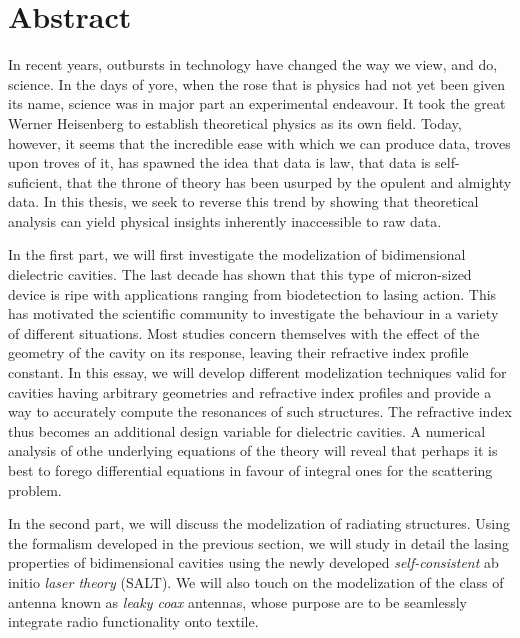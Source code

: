 \chapter*{Abstract}

In recent years, outbursts in technology have changed the way 
we view, and do, science. In the days of yore, when the rose
that is physics had not yet been given its name, science
was in major part an experimental endeavour. It took the great
Werner Heisenberg to establish theoretical physics as its own field. 
Today, however, it seems that the incredible ease with which we 
can produce data, troves upon troves of it, has spawned the idea
that data is law, that data is self-suficient, that the throne of 
theory has been usurped by the opulent and almighty data. In this
thesis, we seek to reverse this trend by showing that theoretical 
analysis can yield physical insights inherently inaccessible to
raw data. 

In the first part, we will first investigate the modelization of bidimensional dielectric
cavities. The last decade has shown that this type of micron-sized device
is ripe with applications ranging from biodetection to lasing action. 
This has motivated the scientific community to investigate the behaviour in a
variety of different situations. Most studies concern themselves with the effect
of the geometry of the cavity on its response, leaving their refractive index
profile constant. In this essay, we will develop different modelization techniques valid 
for cavities having arbitrary geometries and refractive index profiles and provide
a way to accurately compute the resonances of such structures. The refractive
index thus becomes an additional design variable for dielectric cavities.
A numerical analysis of othe underlying equations of the theory will
reveal that perhaps it is best to forego differential equations 
in favour of integral ones for the scattering problem. 

In the second part, we will discuss the modelization of radiating structures. 
Using the formalism developed in the previous section, we will study in detail the 
lasing properties of bidimensional cavities using the newly developed
\textit{self-consistent} ab initio \textit{laser theory} (SALT). We will also
touch on the modelization of the class of antenna known as \textit{leaky coax} antennas, 
whose purpose are to be seamlessly integrate radio functionality onto textile.